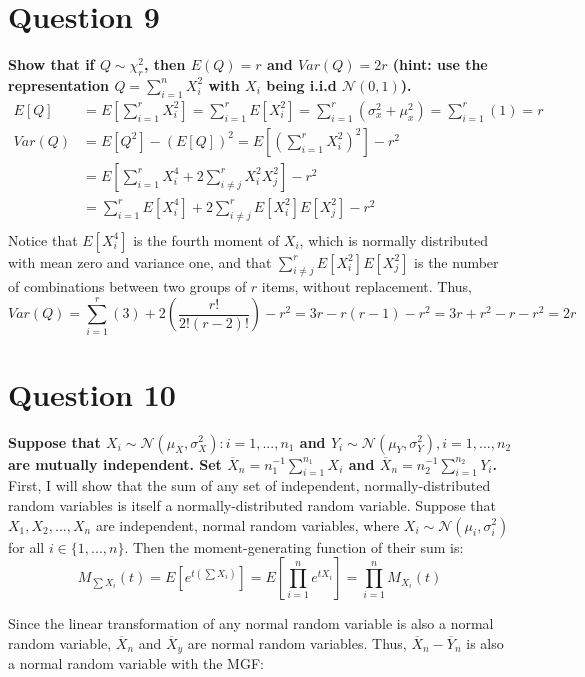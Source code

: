 \documentclass{article}
\newcommand{\N}{\mathcal{N}}
\newcommand{\olx}[1]{\overline{X}_{#1}}
\begin{document}
\section*{Question 9}
\textbf{Show that if $Q\sim \chi^2_r$, then $E(Q)=r$ and $Var(Q)=2r$ (hint: use the representation $Q=\sum_{i=1}^n X_i^2$ with $X_i$ being i.i.d $\N(0,1)$).}
\begin{align*}
	E[Q]	&= E\left[\sum_{i=1}^r X_i^2\right] = \sum_{i=1}^r E[X_i^2] = \sum_{i=1}^r(\sigma_x^2 + \mu_x^2) = \sum_{i=1}^r(1) = r	\\
	Var(Q)	&= E[Q^2] - \left(E[Q]\right)^2 = E\left[\left(\sum_{i=1}^rX_i^2\right)^2\right] - r^2	\\
			&= E\left[\sum_{i=1}^rX_i^4 + 2\sum_{i\neq j}^r X_i^2X_j^2\right] - r^2	\\
			&= \sum_{i=1}^rE\left[X_i^4\right] + 2\sum_{i\neq j}^rE[X_i^2]E[X_j^2] - r^2 \\
\end{align*}
Notice that $E\left[X_i^4\right]$ is the fourth moment of $X_i$, which is normally distributed with mean zero and variance one, and that $\sum_{i\neq j}^rE[X_i^2]E[X_j^2]$ is the number of combinations between two groups of $r$ items, without replacement. Thus,
\[
	Var(Q) = \sum_{i=1}^r(3) + 2\left(\frac{r!}{2!(r-2)!}\right) - r^2 = 3r-r(r-1)-r^2 = 3r+r^2-r-r^2 = 2r
\]


\section*{Question 10}
\textbf{Suppose that $X_i\sim\N(\mu_X,\sigma^2_X):i=1,...,n_1$ and $Y_i\sim\N(\mu_Y,\sigma_Y^2),i=1,...,n_2$ are mutually independent. Set $\overline{X}_n=n_1^{-1}\sum_{i=1}^{n_1}X_i$ and $\overline{X}_n=n_2^{-1}\sum_{i=1}^{n_2}Y_i$.}
\bigskip \\
First, I will show that the sum of any set of independent, normally-distributed random variables is itself a normally-distributed random variable. Suppose that $X_1,X_2,...,X_n$ are independent, normal random variables, where $X_i\sim\N(\mu_i,\sigma^2_i)$ for all $i\in\{1,...,n\}$. Then the moment-generating function of their sum is:
\[
	M_{\sum X_i}(t) = E\left[e^{t(\sum X_i)}\right] = E\left[\prod_{i=1}^n e^{tX_i}\right] = \prod_{i=1}^n M_{X_i}(t)
\]

Since the linear transformation of any normal random variable is also a normal random variable, $\olx{n}$ and $\olx{y}$ are normal random variables. Thus, $\overline{X}_n-\overline{Y}_n$ is also a normal random variable with the MGF:
	
\end{document}
